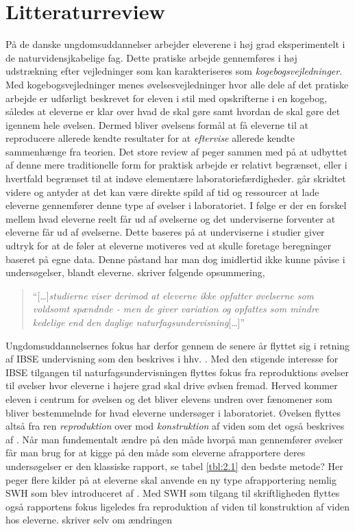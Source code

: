 \section{Litteraturreview}
\label{sec:2.4}

På de danske ungdomsuddannelser arbejder eleverene i høj grad eksperimentelt i de naturvidensjkabelige fag. Dette pratiske arbejde gennemføres i høj udstrækning efter vejledninger som kan karakteriseres som \emph{kogebogsvejledninger}. Med kogebogsvejledninger menes øvelsesvejledninger hvor alle dele af det pratiske arbejde er udførligt beskrevet for eleven i stil med opskrifterne i en kogebog, således at eleverne er klar over hvad de skal gøre samt hvordan de skal gøre det igennem hele øvelsen. Dermed bliver øvelsens formål at få eleverne til at reproducere allerede kendte resultater for at \emph{eftervise} allerede kendte sammenhænge fra teorien. Det store review af \citep{Miller2018} peger sammen med \citep{Hodson2008} på at udbyttet af denne mere traditionelle form for praktisk arbejde er relativt begrænset, eller i hvertfald begrænset til at indøve elementære laboratoriefærdigheder. \citep{Hodson2008} går skridtet videre og antyder at det kan være direkte spild af tid og ressourcer at lade eleverne gennemfører denne type af øvelser i laboratoriet.  I følge \citep{Hodson2008} er der en forskel mellem hvad eleverne reelt får ud af øvelserne  og det underviserne forventer at eleverne får ud af øvelserne. Dette baseres på at underviserne i studier giver udtryk for at de føler at eleverne motiveres ved at skulle foretage beregninger baseret på egne data. Denne påstand har man dog imidlertid ikke kunne påvise i undersøgelser, blandt eleverne. \citet{Krogh2016} skriver følgende opsummering,
\begin{quote}
``[\ldots]\emph{studierne viser derimod at eleverne ikke opfatter øvelserne som voldsomt spændnde - men de giver variation og opfattes som mindre kedelige end den daglige naturfagsundervisning}[\ldots]''
\end{quote}
Ungdomsuddannelsernes fokus har derfor gennem de senere år flyttet sig i retning af IBSE undervisning som den beskrives i hhv. \citep{Dolin2014, Krogh2016}. Med den stigende interesse for IBSE tilgangen til naturfagsundervisningen flyttes fokus fra reproduktions øvelser til øvelser hvor eleverne i højere grad skal drive øvlsen fremad. Herved kommer eleven i centrum for øvelsen og det bliver elevens undren over fænomener som bliver bestemmelnde for hvad eleverne undersøger i laboratoriet. Øvelsen flyttes altså fra ren \emph{reproduktion} over mod \emph{konstruktion} af viden som det også beskrives af \citep{Krogh2016}. Når man fundementalt ændre på den måde hvorpå man gennemfører øvelser får man brug for at kigge på den måde som eleverne afrapportere deres undersøgelser er den klassiske rapport, se tabel \vref{tbl:2.1} den bedste metode?  Her peger flere kilder \citep[m.fl.]{Burke2005, Erkol2010} på at eleverne skal anvende en ny type afrapportering nemlig SWH som blev introduceret af \citep{Keys1999}. Med SWH som tilgang til skriftligheden flyttes også rapportens fokus ligeledes fra reproduktion af viden til konstruktion af viden hos eleverne. \citet{Keys1999} skriver selv om ændringen 
